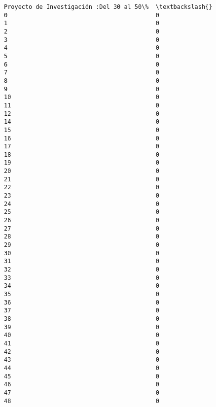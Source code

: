 \documentclass[11pt]{article}
\begin{document}
\begin{Verbatim}[commandchars=\\\{\}]
    Proyecto de Investigación :Del 30 al 50\%  \textbackslash{}
0                                          0   
1                                          0   
2                                          0   
3                                          0   
4                                          0   
5                                          0   
6                                          0   
7                                          0   
8                                          0   
9                                          0   
10                                         0   
11                                         0   
12                                         0   
14                                         0   
15                                         0   
16                                         0   
17                                         0   
18                                         0   
19                                         0   
20                                         0   
21                                         0   
22                                         0   
23                                         0   
24                                         0   
25                                         0   
26                                         0   
27                                         0   
28                                         0   
29                                         0   
30                                         0   
31                                         0   
32                                         0   
33                                         0   
34                                         0   
35                                         0   
36                                         0   
37                                         0   
38                                         0   
39                                         0   
40                                         0   
41                                         0   
42                                         0   
43                                         0   
44                                         0   
45                                         0   
46                                         0   
47                                         0   
48                                         0   


\end{Verbatim}
\end{document}

